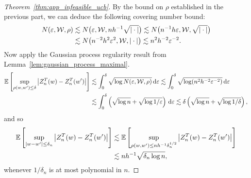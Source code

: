 \begin{proof}[Theorem~\ref{thm:app_infeasible_ucb}]
  By the bound on $\rho$ established in the previous part,
  we can deduce the following covering number bound:
  \begin{align*}
    N(\varepsilon, \mathcal{W}, \rho)
    &\lesssim
    N\big(
      \varepsilon,
      \mathcal{W},
      n h^{-1} \sqrt{|\cdot|}
    \big)
    \lesssim
    N\big(
      n^{-1} h \varepsilon,
      \mathcal{W},
      \sqrt{|\cdot|}
    \big) \\
    &\lesssim
    N\big(
      n^{-2} h^2 \varepsilon^2,
      \mathcal{W},
      |\cdot|
    \big)
    \lesssim
    n^2 h^{-2} \varepsilon^{-2}.
  \end{align*}
  Now apply the Gaussian process regularity result from
  Lemma~\ref{lem:gaussian_process_maximal}.
  \begin{align*}
    \mathbb{E}\left[
      \sup_{\rho(w,w') \leq \delta}
      \big| Z_n^T(w) - Z_n^T(w') \big|
    \right]
    &\lesssim
    \int_0^{\delta}
    \sqrt{\log N(\varepsilon, \mathcal{W}, \rho)}
    \,\mathrm{d}\varepsilon
    \lesssim
    \int_0^{\delta}
    \sqrt{\log (n^2 h^{-2} \varepsilon^{-2})}
    \,\mathrm{d}\varepsilon \\
    &\lesssim
    \int_0^{\delta}
    \left(
      \sqrt{\log n}
      + \sqrt{\log 1/\varepsilon}
    \right)
    \,\mathrm{d}\varepsilon
    \lesssim
    \delta
    \left(
      \sqrt{\log n}
      + \sqrt{\log 1/\delta}
    \right),
  \end{align*}
  and so
  \begin{align*}
    \mathbb{E}\left[
      \sup_{|w-w'| \leq \delta_n}
      \big| Z_n^T(w) - Z_n^T(w') \big|
    \right]
    &\lesssim
    \mathbb{E}\left[
      \sup_{\rho(w,w') \leq n h^{-1} \delta_n^{1/2}}
      \big| Z_n^T(w) - Z_n^T(w') \big|
    \right] \\
    &\lesssim
    n h^{-1}
    \sqrt{\delta_n \log n},
  \end{align*}
  whenever $1/\delta_n$
  is at most polynomial in $n$.



\end{proof}
